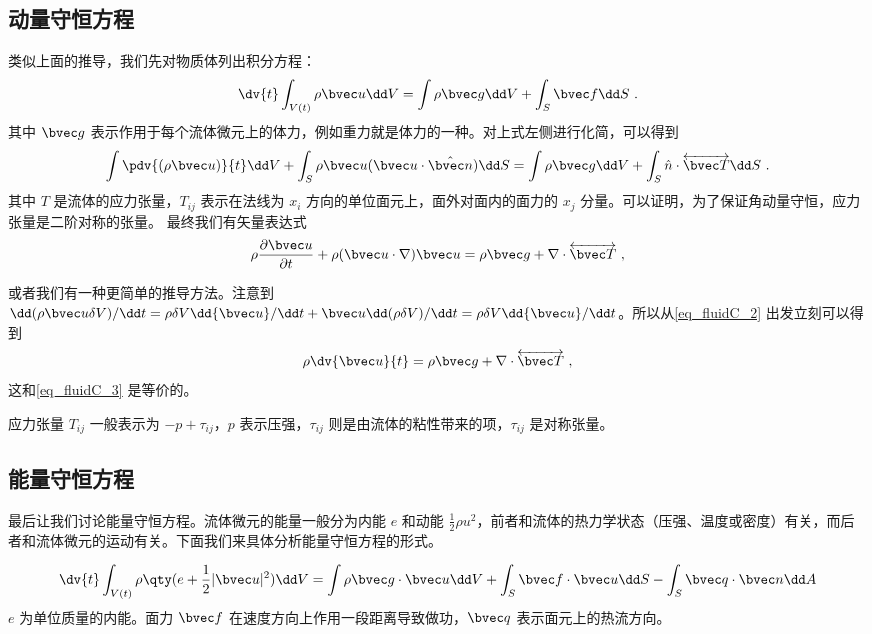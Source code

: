 \subsection{动量守恒方程}
类似上面的推导，我们先对物质体列出积分方程：
\begin{equation}\label{eq_fluidC_2}
\dv{t}\int_{V(t)} \rho \bvec u \dd V=\int \rho \bvec g\dd V+\int_S \bvec f\dd S~.
\end{equation}
其中 $\bvec g$ 表示作用于每个流体微元上的体力，例如重力就是体力的一种。对上式左侧进行化简，可以得到
\begin{equation}
\int \pdv{(\rho \bvec u)}{t}\dd V+\int_S\rho \bvec u (\bvec u\cdot \hat{\bvec n})\dd S=\int \rho\bvec g\dd V+\int_S \hat n\cdot \overleftrightarrow {\bvec T}\dd S~.
\end{equation}
其中 $T$ 是流体的应力张量，$T_{ij}$ 表示在法线为 $x_i$ 方向的单位面元上，面外对面内的面力的 $x_j$ 分量。可以证明，为了保证角动量守恒，应力张量是二阶对称的张量。
最终我们有矢量表达式
\begin{equation}\label{eq_fluidC_3}
\rho \frac{\partial \bvec u}{\partial t}+\rho(\bvec u\cdot \nabla)\bvec u=\rho \bvec g+\nabla\cdot \overleftrightarrow {\bvec T}~,
\end{equation}

或者我们有一种更简单的推导方法。注意到 $\dd(\rho \bvec u \delta V)/\dd t=\rho \delta V \dd {\bvec u}/\dd t+\bvec u \dd (\rho \delta V)/\dd t=\rho \delta V \dd {\bvec u}/\dd t$。所以从\autoref{eq_fluidC_2} 出发立刻可以得到
\begin{equation}
\rho \dv{\bvec u}{t}=\rho \bvec g+\nabla\cdot \overleftrightarrow {\bvec T}~,
\end{equation}
这和\autoref{eq_fluidC_3} 是等价的。

应力张量 $T_{ij}$ 一般表示为 $-p+\tau_{ij}$，$p$ 表示压强，$\tau_{ij}$ 则是由流体的粘性带来的项，$\tau_{ij}$ 是对称张量。

\subsection{能量守恒方程}
最后让我们讨论能量守恒方程。流体微元的能量一般分为内能 $e$ 和动能 $\frac{1}{2}\rho u^2$，前者和流体的热力学状态（压强、温度或密度）有关，而后者和流体微元的运动有关。下面我们来具体分析能量守恒方程的形式。

\begin{equation}
\dv{t} \int_{V(t)} \rho\qty(e+\frac{1}{2}|\bvec u|^2)\dd V=\int \rho \bvec g\cdot \bvec u \dd V+\int_S \bvec f\cdot \bvec u \dd S -\int_S \bvec q\cdot \bvec n\dd A
\end{equation}
$e$ 为单位质量的内能。面力 $\bvec f$ 在速度方向上作用一段距离导致做功，$\bvec q$ 表示面元上的热流方向。

